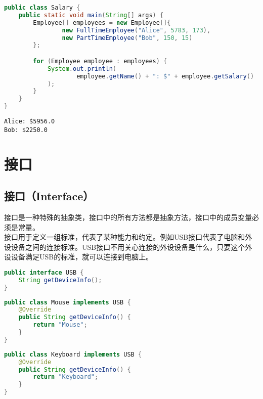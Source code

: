 \begin{lstlisting}[language=Java]
public class Salary {
    public static void main(String[] args) {
        Employee[] employees = new Employee[]{
                new FullTimeEmployee("Alice", 5783, 173),
                new PartTimeEmployee("Bob", 150, 15)
        };

        for (Employee employee : employees) {
            System.out.println(
                    employee.getName() + ": $" + employee.getSalary()
            );
        }
    }
}
\end{lstlisting}

\begin{tcolorbox}
    \begin{verbatim}
Alice: $5956.0
Bob: $2250.0
	\end{verbatim}
\end{tcolorbox}

\newpage

\section{接口}

\subsection{接口（Interface）}

接口是一种特殊的抽象类，接口中的所有方法都是抽象方法，接口中的成员变量必须是常量。\\

接口用于定义一组标准，代表了某种能力和约定。例如USB接口代表了电脑和外设设备之间的连接标准。USB接口不用关心连接的外设设备是什么，只要这个外设设备满足USB的标准，就可以连接到电脑上。\\


\begin{lstlisting}[language=Java]
public interface USB {
    String getDeviceInfo();
}
\end{lstlisting}

\begin{lstlisting}[language=Java]
public class Mouse implements USB {
    @Override
    public String getDeviceInfo() {
        return "Mouse";
    }
}
\end{lstlisting}

\begin{lstlisting}[language=Java]
public class Keyboard implements USB {
    @Override
    public String getDeviceInfo() {
        return "Keyboard";
    }
}
\end{lstlisting}

